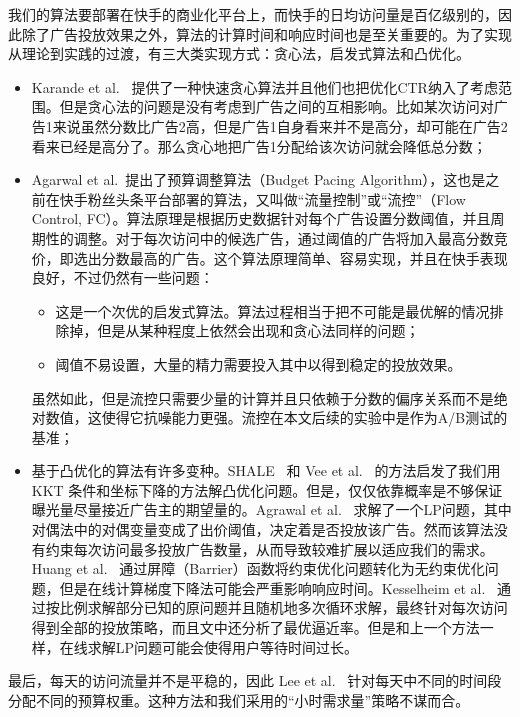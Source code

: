 我们的算法要部署在快手的商业化平台上，而快手的日均访问量是百亿级别的，因此除了广告投放效果之外，算法的计算时间和响应时间也是至关重要的。为了实现从理论到实践的过渡，有三大类实现方式：贪心法，启发式算法和凸优化。
\begin{itemize}
	\item Karande et al.~\cite{karande2013optimizing} 提供了一种快速贪心算法并且他们也把优化CTR纳入了考虑范围。但是贪心法的问题是没有考虑到广告之间的互相影响。比如某次访问对广告1来说虽然分数比广告2高，但是广告1自身看来并不是高分，却可能在广告2看来已经是高分了。那么贪心地把广告1分配给该次访问就会降低总分数；
	\item Agarwal et al.~\cite{agarwal2014budget}提出了预算调整算法（Budget Pacing Algorithm），这也是之前在快手粉丝头条平台部署的算法，又叫做“流量控制”或“流控”（Flow Control, FC）。算法原理是根据历史数据针对每个广告设置分数阈值，并且周期性的调整。对于每次访问中的候选广告，通过阈值的广告将加入最高分数竞价，即选出分数最高的广告。这个算法原理简单、容易实现，并且在快手表现良好，不过仍然有一些问题：
	\begin{itemize}[*]
		\item 这是一个次优的启发式算法。算法过程相当于把不可能是最优解的情况排除掉，但是从某种程度上依然会出现和贪心法同样的问题；
		\item 阈值不易设置，大量的精力需要投入其中以得到稳定的投放效果。
	\end{itemize}
	虽然如此，但是流控只需要少量的计算并且只依赖于分数的偏序关系而不是绝对数值，这使得它抗噪能力更强。流控在本文后续的实验中是作为A/B测试的基准；
	\item 基于凸优化的算法有许多变种。SHALE~\cite{bharadwaj2012shale} 和 Vee et al.~\cite{Vee2010Optimal} 的方法启发了我们用 KKT 条件和坐标下降的方法解凸优化问题。但是，仅仅依靠概率是不够保证曝光量尽量接近广告主的期望量的。Agrawal et al.~\cite{agrawal2014dynamic} 求解了一个LP问题，其中对偶法中的对偶变量变成了出价阈值，决定着是否投放该广告。然而该算法没有约束每次访问最多投放广告数量，从而导致较难扩展以适应我们的需求。Huang et al.~\cite{huang2016online} 通过屏障（Barrier）函数将约束优化问题转化为无约束优化问题，但是在线计算梯度下降法可能会严重影响响应时间。Kesselheim et al.~\cite{kesselheim2014primal} 通过按比例求解部分已知的原问题并且随机地多次循环求解，最终针对每次访问得到全部的投放策略，而且文中还分析了最优逼近率。但是和上一个方法一样，在线求解LP问题可能会使得用户等待时间过长。
\end{itemize}

最后，每天的访问流量并不是平稳的，因此 Lee et al.~\cite{lee2013real} 针对每天中不同的时间段分配不同的预算权重。这种方法和我们采用的“小时需求量”策略不谋而合。

